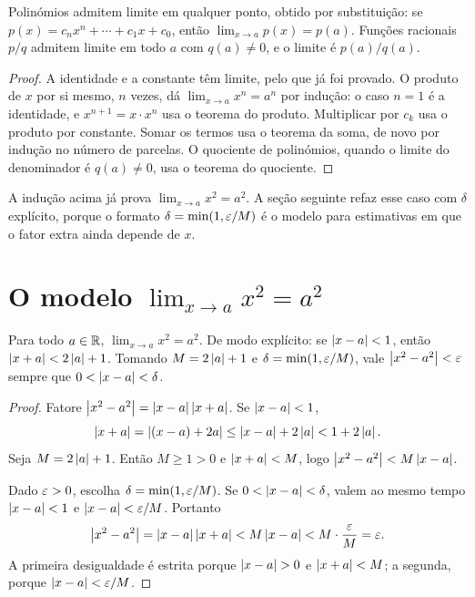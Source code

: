 \documentclass[11pt,a4paper]{article}
\begin{document}
\begin{corolario}
\label{cor:polinomio}
Polin\'omios admitem limite em qualquer ponto, obtido por substitui\c{c}\~ao: se $p(x)=c_n x^n+\cdots+c_1 x+c_0$, ent\~ao $\lim_{x\to a}p(x)=p(a)$. Fun\c{c}\~oes racionais $p/q$ admitem limite em todo $a$ com $q(a)\neq 0$, e o limite \'e $p(a)/q(a)$.
\end{corolario}

\begin{proof}
A identidade e a constante t\^em limite, pelo que j\'a foi provado. O produto de $x$ por si mesmo, $n$ vezes, d\'a $\lim_{x\to a}x^n=a^n$ por indu\c{c}\~ao: o caso $n=1$ \'e a identidade, e $x^{n+1}=x\cdot x^n$ usa o teorema do produto. Multiplicar por $c_k$ usa o produto por constante. Somar os termos usa o teorema da soma, de novo por indu\c{c}\~ao no n\'umero de parcelas. O quociente de polin\'omios, quando o limite do denominador \'e $q(a)\neq 0$, usa o teorema do quociente.
\end{proof}

A indu\c{c}\~ao acima j\'a prova $\lim_{x\to a}x^2=a^2$. A se\c{c}\~ao seguinte refaz esse caso com $\delta$ expl\'icito, porque o formato $\delta=\min(1,\varepsilon/M)$ \'e o modelo para estimativas em que o fator extra ainda depende de $x$.

\section{O modelo $\lim_{x\to a}x^2=a^2$}
\label{sec:quadrado}

\begin{teorema}
\label{teo:quadrado}
Para todo $a\in\mathbb{R}$, $\lim_{x\to a}x^2=a^2$. De modo expl\'icito: se $\left\lvert x-a \right\rvert<1$, ent\~ao $\left\lvert x+a \right\rvert<2\left\lvert a \right\rvert+1$. Tomando $M=2\left\lvert a \right\rvert+1$ e $\delta=\min(1,\varepsilon/M)$, vale $\left\lvert x^2-a^2 \right\rvert<\varepsilon$ sempre que $0<\left\lvert x-a \right\rvert<\delta$.
\end{teorema}

\begin{proof}
Fatore $\left\lvert x^2-a^2 \right\rvert=\left\lvert x-a \right\rvert\left\lvert x+a \right\rvert$. Se $\left\lvert x-a \right\rvert<1$,
\[
\left\lvert x+a \right\rvert=\left\lvert (x-a)+2a \right\rvert\le \left\lvert x-a \right\rvert+2\left\lvert a \right\rvert<1+2\left\lvert a \right\rvert.
\]
Seja $M=2\left\lvert a \right\rvert+1$. Ent\~ao $M\ge 1>0$ e $\left\lvert x+a \right\rvert<M$, logo $\left\lvert x^2-a^2 \right\rvert<M\left\lvert x-a \right\rvert$.

Dado $\varepsilon>0$, escolha $\delta=\min(1,\varepsilon/M)$. Se $0<\left\lvert x-a \right\rvert<\delta$, valem ao mesmo tempo $\left\lvert x-a \right\rvert<1$ e $\left\lvert x-a \right\rvert<\varepsilon/M$. Portanto
\[
\left\lvert x^2-a^2 \right\rvert=\left\lvert x-a \right\rvert\left\lvert x+a \right\rvert<M\left\lvert x-a \right\rvert<M\cdot\frac{\varepsilon}{M}=\varepsilon.
\]
A primeira desigualdade \'e estrita porque $\left\lvert x-a \right\rvert>0$ e $\left\lvert x+a \right\rvert<M$; a segunda, porque $\left\lvert x-a \right\rvert<\varepsilon/M$.
\end{proof}
\end{document}
